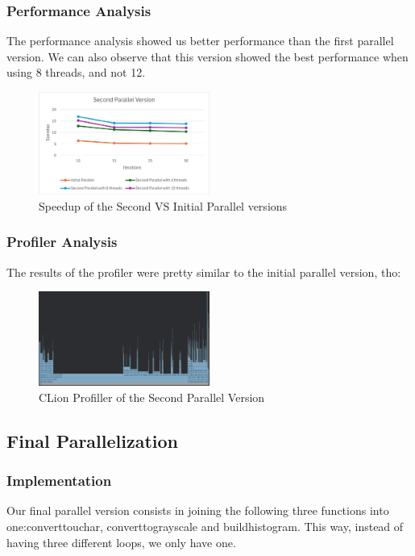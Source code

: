 \documentclass[sigconf]{acmart}
\begin{document}
\subsubsection{Performance Analysis}
The performance analysis showed us better performance than the first parallel version. We can also observe that this version showed the best performance when using 8 threads, and not 12.
\begin{figure}[h]
    \centering
    \includegraphics[width=0.5\textwidth]{SecondParallelSpeedup.png}
    \caption{Speedup of the Second VS Initial Parallel versions}
\end{figure}

\subsubsection{Profiler Analysis}
The results of the profiler were pretty similar to the initial parallel version, tho:
\begin{figure}[h]
    \centering
    \includegraphics[width=0.5\textwidth]{SecondParallelProfiler.png}
    \caption{CLion Profiller of the Second Parallel Version}
\end{figure}

\subsection{Final Parallelization}
\subsubsection{Implementation}
Our final parallel version consists in joining the following three functions into one:convert\textunderscore to\textunderscore uchar, convert\textunderscore to\textunderscore grayscale and build\textunderscore histogram. This way, instead of having three different loops, we only have one.
\end{document}
